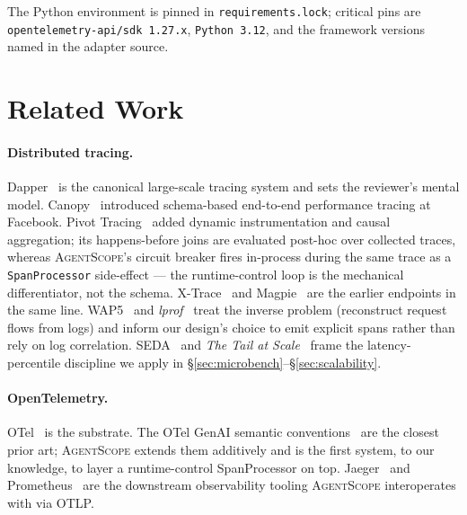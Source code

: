 \documentclass[sigplan,10pt,anonymous,review]{acmart}
\newcommand{\sysname}{\textsc{AgentScope}\xspace}
\begin{document}
The Python environment is pinned in \texttt{requirements.lock};
critical pins are \texttt{opentelemetry-api/sdk 1.27.x},
\texttt{Python 3.12}, and the framework versions named in the
adapter source.

\section{Related Work}
\label{sec:related}

\paragraph{Distributed tracing.} Dapper~\cite{dapper} is the canonical
large-scale tracing system and sets the reviewer's mental model.
Canopy~\cite{canopy} introduced schema-based end-to-end performance
tracing at Facebook. Pivot Tracing~\cite{pivottracing} added dynamic
instrumentation and causal aggregation; its happens-before joins are
evaluated post-hoc over collected traces, whereas \sysname's circuit
breaker fires in-process during the same trace as a
\texttt{SpanProcessor} side-effect --- the runtime-control loop is the
mechanical differentiator, not the schema. X-Trace~\cite{xtrace} and
Magpie~\cite{magpie} are the earlier endpoints in the same line.
WAP5~\cite{lighthouse} and \emph{lprof}~\cite{ohmygod_lprof} treat the
inverse problem (reconstruct request flows from logs) and inform our
design's choice to emit explicit spans rather than rely on log
correlation. SEDA~\cite{aegis_seda} and \emph{The Tail at
Scale}~\cite{stout} frame the latency-percentile discipline we apply in
\S\ref{sec:microbench}--\S\ref{sec:scalability}.

\paragraph{OpenTelemetry.} OTel~\cite{otel} is the substrate. The OTel
GenAI semantic conventions~\cite{otel_genai} are the closest prior
art; \sysname{} extends them additively and is the first system, to
our knowledge, to layer a runtime-control SpanProcessor on top.
Jaeger~\cite{jaeger} and Prometheus~\cite{prometheus} are
the downstream observability tooling \sysname{} interoperates with via
OTLP.
\end{document}
